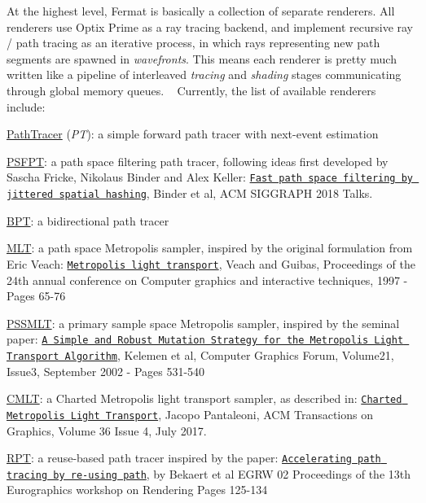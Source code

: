 \begin{DoxyParagraph}{}
At the highest level, Fermat is basically a collection of separate renderers. All renderers use Optix Prime as a ray tracing backend, and implement recursive ray / path tracing as an iterative process, in which rays representing new path segments are spawned in {\itshape wavefronts}. This means each renderer is pretty much written like a pipeline of interleaved {\itshape tracing} and {\itshape shading} stages communicating through global memory queues. ~\newline
 Currently, the list of available renderers include\+: ~\newline

\begin{DoxyItemize}
\item \hyperlink{struct_path_tracer}{Path\+Tracer} ({\itshape PT})\+: a simple forward path tracer with next-\/event estimation
\item \hyperlink{struct_p_s_f_p_t}{P\+S\+F\+PT}\+: a path space filtering path tracer, following ideas first developed by Sascha Fricke, Nikolaus Binder and Alex Keller\+: \href{https://dl.acm.org/citation.cfm?id=3214806}{\tt Fast path space filtering by jittered spatial hashing}, Binder et al, A\+CM S\+I\+G\+G\+R\+A\+PH 2018 Talks.
\item \hyperlink{struct_b_p_t}{B\+PT}\+: a bidirectional path tracer
\item \hyperlink{struct_m_l_t}{M\+LT}\+: a path space Metropolis sampler, inspired by the original formulation from Eric Veach\+: \href{https://graphics.stanford.edu/papers/metro/metro.pdf}{\tt Metropolis light transport}, Veach and Guibas, Proceedings of the 24th annual conference on Computer graphics and interactive techniques, 1997 -\/ Pages 65-\/76
\item \hyperlink{struct_p_s_s_m_l_t}{P\+S\+S\+M\+LT}\+: a primary sample space Metropolis sampler, inspired by the seminal paper\+: \href{https://onlinelibrary.wiley.com/doi/pdf/10.1111/1467-8659.t01-1-00703}{\tt A Simple and Robust Mutation Strategy for the Metropolis Light Transport Algorithm}, Kelemen et al, Computer Graphics Forum, Volume21, Issue3, September 2002 -\/ Pages 531-\/540
\item \hyperlink{struct_c_m_l_t}{C\+M\+LT}\+: a Charted Metropolis light transport sampler, as described in\+: \href{https://arxiv.org/abs/1612.05395}{\tt Charted Metropolis Light Transport}, Jacopo Pantaleoni, A\+CM Transactions on Graphics, Volume 36 Issue 4, July 2017.
\item \hyperlink{struct_r_p_t}{R\+PT}\+: a reuse-\/based path tracer inspired by the paper\+: \href{https://www.researchgate.net/publication/220853005_Accelerating_Path_Tracing_by_Re-Using_Paths}{\tt Accelerating path tracing by re-\/using path}, by Bekaert et al E\+G\+RW \textquotesingle{}02 Proceedings of the 13th Eurographics workshop on Rendering Pages 125-\/134 
\end{DoxyItemize}
\end{DoxyParagraph}
